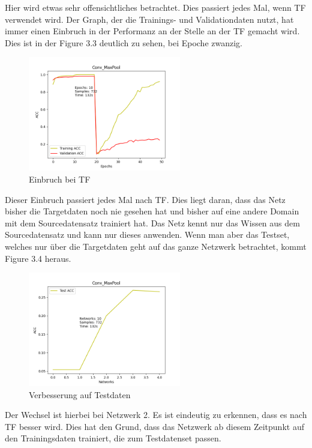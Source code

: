 Hier wird etwas sehr offensichtliches betrachtet. Dies passiert jedes Mal, wenn TF verwendet wird. 
Der Graph, der die Trainings- und Validationdaten nutzt, hat immer einen Einbruch in der Performanz an der Stelle an 
der TF gemacht wird. Dies ist in der Figure 3.3 deutlich zu sehen, bei Epoche zwanzig.

\begin{figure}[htpb]
    \includegraphics[height=5cm]{../../Plots/ba_plots/convmaxpool/convmaxpooltrain.png}
    \caption{\label{fig:convmaxpooltrain} Einbruch bei TF}
\end{figure}

Dieser Einbruch passiert jedes Mal nach TF. Dies liegt daran, dass das Netz bisher die Targetdaten noch nie gesehen hat und bisher 
auf eine andere Domain mit dem Sourcedatensatz trainiert hat. Das Netz kennt nur das Wissen aus dem Sourcedatensatz und kann nur dieses 
anwenden. Wenn man aber das Testset, welches nur über die Targetdaten geht auf das ganze Netzwerk betrachtet, kommt Figure 3.4 heraus. 

\begin{figure}[htpb]
    \includegraphics[height=5cm]{../../Plots/ba_plots/convmaxpool/convmaxpooltest.png}
    \caption{\label{fig:convmaxpooltest} Verbesserung auf Testdaten}
\end{figure}

Der Wechsel ist hierbei bei Netzwerk 2. Es ist eindeutig zu erkennen, dass es nach TF besser wird. Dies hat den Grund, dass das Netzwerk 
ab diesem Zeitpunkt auf den Trainingsdaten trainiert, die zum Testdatenset passen. 
